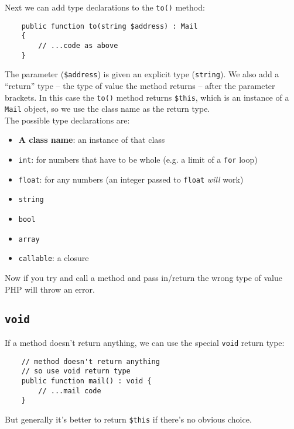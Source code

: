 Next we can add type declarations to the \texttt{to()} method:

\begin{verbatim}
    public function to(string $address) : Mail
    {
        // ...code as above
    }
\end{verbatim}

The parameter (\texttt{\$address}) is given an explicit type (\texttt{string}). We also add a ``return'' type – the type of value the method returns – after the parameter brackets. In this case the \texttt{to()} method returns \texttt{\$this}, which is an instance of a \texttt{Mail} object, so we use the class name as the return type.
\\

The possible type declarations are:

\begin{itemize}
    \item \textbf{A class name}: an instance of that class
    \item \texttt{int}: for numbers that have to be whole (e.g. a limit of a \texttt{for} loop)
    \item \texttt{float}: for any numbers (an integer passed to \texttt{float} \textit{will} work)
    \item \texttt{string}
    \item \texttt{bool}
    \item \texttt{array}
    \item \texttt{callable}: a closure
\end{itemize}

Now if you try and call a method and pass in/return the wrong type of value PHP will throw an error.

\subsection{\texttt{void}}

If a method doesn't return anything, we can use the special \texttt{void} return type:

\begin{verbatim}
    // method doesn't return anything
    // so use void return type
    public function mail() : void {
        // ...mail code
    }
\end{verbatim}

But generally it's better to return \texttt{\$this} if there's no obvious choice.


\pagebreak


